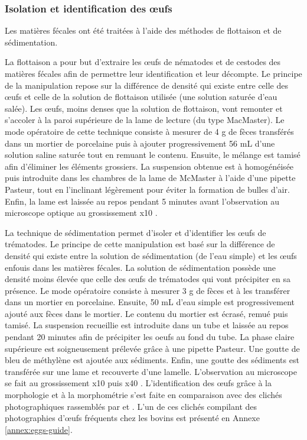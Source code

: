 \subsubsection{Isolation et identification des \oe ufs}
Les matières fécales ont été traitées à l'aide des méthodes de flottaison et de sédimentation.
\par La flottaison a pour but d'extraire les œufs de nématodes et de cestodes des matières 
fécales afin de permettre leur identification et leur décompte. Le principe de la manipulation 
repose sur la différence de densité qui existe entre celle des œufs et celle de la solution 
de flottaison utilisée (une solution saturée d'eau salée). Les œufs, moins denses que la 
solution de flottaison, vont remonter et s'accoler à la paroi supérieure de la lame de 
lecture (du type MacMaster). Le mode opératoire de cette technique consiste à mesurer de 
4 g de fèces transférés dans un mortier de porcelaine puis à ajouter progressivement 56 mL 
d'une solution saline saturée tout en remuant le contenu. Ensuite, le mélange est tamisé 
afin d'éliminer les éléments grossiers. La suspension obtenue est à homogénéisée puis 
introduite dans les chambres de la lame de McMaster à l'aide d'une pipette Pasteur, tout 
en l'inclinant légèrement pour éviter la formation de bulles d'air. Enfin, la lame est 
laissée au repos pendant 5 minutes avant l'observation au microscope optique au grossissement 
x10 .
\par La technique de sédimentation permet d'isoler et d'identifier les œufs de trématodes. 
Le principe de cette manipulation est basé sur la différence de densité qui existe entre 
la solution de sédimentation (de l'eau simple) et les œufs enfouis dans les matières fécales. 
La solution de sédimentation possède une densité moins élevée que celle des œufs de trématodes 
qui vont précipiter en sa présence. Le mode opératoire consiste à mesurer 3 g de fèces et à 
les transférer dans un mortier en porcelaine. Ensuite, 50 mL d'eau simple est progressivement 
ajouté aux fèces dans le mortier. Le contenu du mortier est écrasé, remué puis tamisé. 
La suspension recueillie est introduite dans un tube et laissée au repos pendant 20 minutes 
afin de précipiter les oeufs au fond du tube. La phase claire
supérieure est soigneusement prélevée grâce à une pipette Pasteur. Une goutte de bleu de 
méthylène est ajoutée aux sédiments. Enfin, une goutte des sédiments est transférée sur 
une lame et recouverte d'une lamelle. L'observation au microscope se fait au grossissement 
x10 puis x40 . L'identification des \oe ufs grâce à la morphologie et à la 
morphométrie s'est faite en comparaison avec des clichés photographiques rassemblés par 
 et . L'un de ces clichés compilant des photographies d'\oe ufs fréquents chez les bovins est présenté en Annexe \ref{annex:eggs-guide}.

